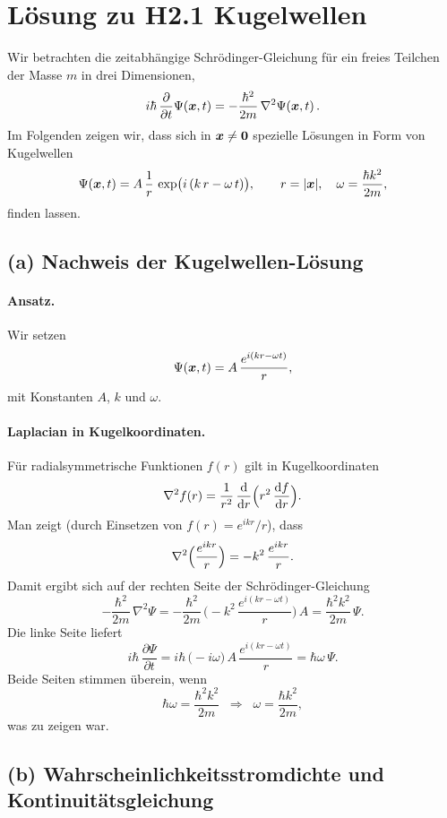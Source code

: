\documentclass[a4paper,11pt]{article}
\begin{document}
\section*{Lösung zu H2.1 Kugelwellen}

Wir betrachten die zeitabhängige Schrödinger-Gleichung für ein freies Teilchen der Masse \(m\) in drei Dimensionen,
\[
i\hbar\,\frac{\partial}{\partial t}\Psi(\vb*{x},t)
=
-\frac{\hbar^2}{2m}\,\nabla^2\Psi(\vb*{x},t)\,.
\]
Im Folgenden zeigen wir, dass sich in \( \vb*{x}\neq \vb*{0} \) spezielle Lösungen in Form von Kugelwellen
\[
\Psi(\vb*{x},t)
= A\,\frac{1}{r}\,\exp\bigl(i\,(k\,r - \omega\,t)\bigr),
\qquad
r = \lvert \vb*{x}\rvert,
\quad
\omega = \frac{\hbar k^2}{2m},
\]
finden lassen.

\subsection*{(a) Nachweis der Kugelwellen-Lösung}

\paragraph{Ansatz.}
Wir setzen
\[
\Psi(\vb*{x},t)
= A\,\frac{e^{i(kr - \omega t)}}{r},
\]
mit Konstanten \(A\), \(k\) und \(\omega\).

\paragraph{Laplacian in Kugelkoordinaten.}
Für radialsymmetrische Funktionen \(f(r)\) gilt in Kugelkoordinaten
\[
\nabla^2 f(r)
= \frac{1}{r^2}\,\frac{\dd}{\dd r}
\Bigl(r^2\,\frac{\dd f}{\dd r}\Bigr).
\]
Man zeigt (durch Einsetzen von \(f(r) = e^{ikr}/r\)), dass
\[
\nabla^2\Bigl(\frac{e^{ikr}}{r}\Bigr)
= -k^2\,\frac{e^{ikr}}{r}.
\]
Damit ergibt sich auf der rechten Seite der Schrödinger-Gleichung
\[
-\frac{\hbar^2}{2m}\,\nabla^2\Psi
= -\frac{\hbar^2}{2m}\,
\bigl(-k^2\,\frac{e^{i(kr-\omega t)}}{r}\bigr)\,A
= \frac{\hbar^2 k^2}{2m}\,\Psi.
\]
Die linke Seite liefert
\[
i\hbar\,\frac{\partial\Psi}{\partial t}
= i\hbar\,\bigl(-i\omega\bigr)\,
A\,\frac{e^{i(kr-\omega t)}}{r}
= \hbar\omega\,\Psi.
\]
Beide Seiten stimmen überein, wenn
\[
\hbar\omega = \frac{\hbar^2 k^2}{2m}
\;\;\Longrightarrow\;\;
\omega = \frac{\hbar k^2}{2m},
\]
was zu zeigen war.

\subsection*{(b) Wahrscheinlichkeitsstromdichte und Kontinuitätsgleichung}
\end{document}
